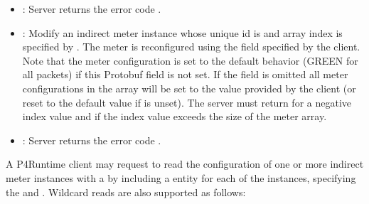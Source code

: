 \documentclass[11pt]{article}
\begin{document}
{%
\begin{itemize}[noitemsep,topsep=\mdcompacttopsep]%

\item{}: Server returns the error code .%

\item{}: Modify an indirect meter instance whose unique id is  and
array index is specified by . The meter is reconfigured using the
 field specified by the client. Note that the meter configuration is
set to the default behavior (GREEN for all packets) if this Protobuf field is
not set. If the  field is omitted all meter configurations in the array
will be set to the value provided by the client (or reset to the default value
if  is unset). The server must return  for a
negative index value and  if the index value exceeds the size of
the meter array.%

\item{}: Server returns the error code .%
\end{itemize}%

\noindent{}A P4Runtime client may request to read the configuration of one or more indirect
meter instances with a  by including a  entity for each
of the instances, specifying the  and . Wildcard reads are also
supported as follows:%

}
\end{document}
